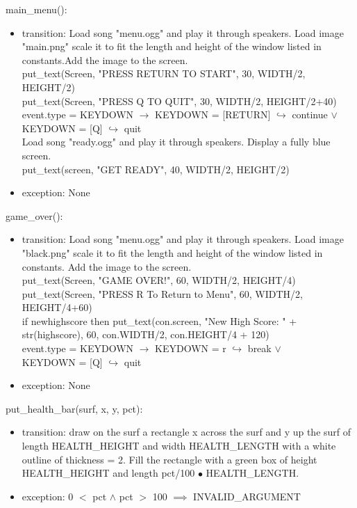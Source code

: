 \documentclass[12pt, titlepage]{article}
\begin{document}
\noindent main\_menu():
\begin{itemize}
\item transition: Load song "menu.ogg" and play it through speakers. Load image "main.png" scale it to fit the length and height of the window listed in constants.Add the image to the screen.\\
put\_text(Screen, "PRESS RETURN TO START", 30, WIDTH/2, HEIGHT/2)\\
put\_text(Screen, "PRESS Q TO QUIT", 30, WIDTH/2, HEIGHT/2+40)\\
event.type = KEYDOWN $\longrightarrow$ KEYDOWN = [RETURN] $\hookrightarrow$ continue $\vee$ \\
KEYDOWN = [Q] $\hookrightarrow$ quit \\
Load song "ready.ogg" and play it through speakers. Display a fully blue screen.\\
put\_text(screen, "GET READY", 40, WIDTH/2, HEIGHT/2)

\item exception: None
\end{itemize}

\noindent game\_over():
\begin{itemize}
\item transition: Load song "menu.ogg" and play it through speakers. Load image "black.png" scale it to fit the length and height of the window listed in constants. Add the image to the screen.\\
put\_text(Screen, "GAME OVER!", 60, WIDTH/2, HEIGHT/4)\\
put\_text(Screen, "PRESS R To Return to Menu", 60, WIDTH/2, HEIGHT/4+60)\\
if newhighscore then put\_text(con.screen, "New High Score: " + str(highscore), 60, con.WIDTH/2, con.HEIGHT/4 + 120)\\
event.type = KEYDOWN $\longrightarrow$ KEYDOWN = r $\hookrightarrow$ break $\vee$ \\
KEYDOWN = [Q] $\hookrightarrow$ quit \\
\item exception: None
\end{itemize}

\noindent put\_health\_bar(surf, x, y, pct):
\begin{itemize}
\item transition: 
draw on the surf a rectangle x across the surf and y up the surf of length HEALTH\_HEIGHT and width HEALTH\_LENGTH with a white outline of thickness = 2. Fill the rectangle with a green box of height HEALTH\_HEIGHT and length pct/100 $\bullet$ HEALTH\_LENGTH.

\item exception: 0 $<$ pct $\wedge$ pct $>$ 100 $\implies$ INVALID\_ARGUMENT
\end{itemize}
\end{document}
